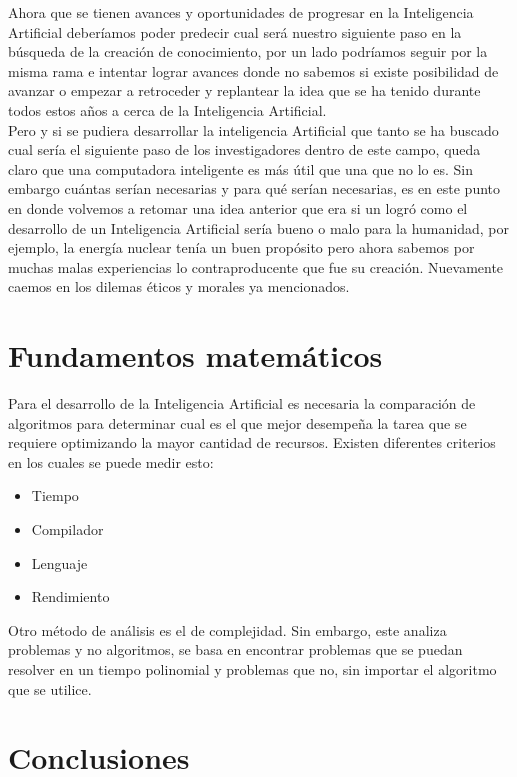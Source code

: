\documentclass[12pt]{article}
\begin{document}
Ahora que se tienen avances y oportunidades de progresar en la Inteligencia Artificial deberíamos poder predecir cual será nuestro siguiente paso en la búsqueda de la creación de conocimiento, por un lado podríamos seguir por la misma rama e intentar lograr avances donde no sabemos si existe posibilidad de avanzar o empezar a retroceder y replantear la idea que se ha tenido durante todos estos años a cerca de la Inteligencia Artificial.\\

Pero y si se pudiera desarrollar la inteligencia Artificial que tanto se ha buscado cual sería el siguiente paso de los investigadores dentro de este campo, queda claro que una computadora inteligente es más útil que una que no lo es. Sin embargo cuántas serían necesarias y para qué serían necesarias, es en este punto en donde volvemos a retomar una idea anterior que era si un logró como el desarrollo de un Inteligencia Artificial sería bueno o malo para la humanidad, por ejemplo, la energía nuclear tenía un buen propósito pero ahora sabemos por muchas malas experiencias lo contraproducente que fue su creación.
Nuevamente caemos en los dilemas éticos y morales ya mencionados.

\section{Fundamentos matemáticos}

Para el desarrollo de la Inteligencia Artificial es necesaria la comparación de algoritmos para determinar cual es el que mejor desempeña la tarea que se requiere optimizando la mayor cantidad de recursos. Existen diferentes criterios en los cuales se puede medir esto: 
\begin{itemize}
    \item Tiempo
    \item Compilador
    \item Lenguaje
    \item Rendimiento
\end{itemize}

Otro método de análisis es el de complejidad. Sin embargo, este analiza problemas y no algoritmos, se basa en encontrar problemas que se puedan resolver en un tiempo polinomial y problemas que no, sin importar el algoritmo que se utilice.  

\section{Conclusiones}
\end{document}
